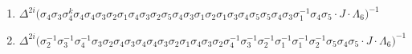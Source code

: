 \begin{enumerate}
    \item $\displaystyle \Delta^{2i} \big( \allowbreak\sigma_{4}\allowbreak\sigma_{3}\allowbreak\sigma_{4}^k\allowbreak\sigma_{4}\allowbreak\sigma_{4}\allowbreak\sigma_{3}\allowbreak\sigma_{2}\allowbreak\sigma_{1}\allowbreak\sigma_{4}\allowbreak\sigma_{3}\allowbreak\sigma_{2}\allowbreak\sigma_{5}\allowbreak\sigma_{4}\allowbreak\sigma_{3}\allowbreak\sigma_{1}\allowbreak\sigma_{2}\allowbreak\sigma_{1}\allowbreak\sigma_{3}\allowbreak\sigma_{4}\allowbreak\sigma_{5}\allowbreak\sigma_{5}\allowbreak\sigma_{4}\allowbreak\sigma_{3}\allowbreak\sigma_{1}^{-1}\allowbreak\sigma_{4}\allowbreak\sigma_{5} \cdot J \cdot \Lambda_6 \big)^{-1}$
    \item $\displaystyle \Delta^{2i} \big( \allowbreak\sigma_{2}^{-1}\allowbreak\sigma_{3}^{-1}\allowbreak\sigma_{4}^{-1}\allowbreak\sigma_{3}\allowbreak\sigma_{2}\allowbreak\sigma_{4}\allowbreak\sigma_{3}\allowbreak\sigma_{4}\allowbreak\sigma_{4}\allowbreak\sigma_{3}\allowbreak\sigma_{2}\allowbreak\sigma_{1}\allowbreak\sigma_{4}\allowbreak\sigma_{3}\allowbreak\sigma_{2}\allowbreak\sigma_{4}^{-1}\allowbreak\sigma_{3}^{-1}\allowbreak\sigma_{2}^{-1}\allowbreak\sigma_{1}^{-1}\allowbreak\sigma_{1}^{-1}\allowbreak\sigma_{2}^{-1}\allowbreak\sigma_{5}\allowbreak\sigma_{4}\allowbreak\sigma_{5} \cdot J \cdot \Lambda_6 \big)^{-1}$
    
    \pagebreak
    

\end{enumerate}
